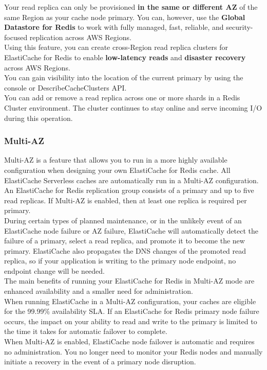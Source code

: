 \documentclass[12pt, letterpaper, twoside]{article}
\begin{document}

Your read replica can only be provisioned \textbf{in the same or different AZ} of the same Region as your cache node primary. 
You can, however, use the \textbf{Global Datastore for Redis} to work with fully managed, fast, reliable, and security-focused replication 
across AWS Regions.\\
Using this feature, you can create cross-Region read replica clusters for ElastiCache for Redis to enable \textbf{low-latency reads} 
and \textbf{disaster recovery} across AWS Regions.\\

You can gain visibility into the location of the current primary by using the console or DescribeCacheClusters API.\\

You can add or remove a read replica across one or more shards in a Redis Cluster environment. The cluster continues to stay online and 
serve incoming I/O during this operation.\\

\subsubsection{Multi-AZ}
Multi-AZ is a feature that allows you to run in a more highly available configuration when designing your own ElastiCache for Redis cache.
All ElastiCache Serverless caches are automatically run in a Multi-AZ configuration. An ElastiCache for Redis replication group consists 
of a primary and up to five read replicas. If Multi-AZ is enabled, then at least one replica is required per primary.\\
During certain types of planned maintenance, or in the unlikely event of an ElastiCache node failure or AZ failure, ElastiCache will 
automatically detect the failure of a primary, select a read replica, and promote it to become the new primary. ElastiCache also propagates 
the DNS changes of the promoted read replica, so if your application is writing to the primary node endpoint, no endpoint change will be 
needed.\\

The main benefits of running your ElastiCache for Redis in Multi-AZ mode are enhanced availability and a smaller need for administration.\\
When running ElastiCache in a Multi-AZ configuration, your caches are eligible for the 99.99\% availability SLA. 
If an ElastiCache for Redis primary node failure occurs, the impact on your ability to read and write to the primary is limited to the time 
it takes for automatic failover to complete.\\
When Multi-AZ is enabled, ElastiCache node failover is automatic and requires no administration. You no longer need to monitor your Redis 
nodes and manually initiate a recovery in the event of a primary node disruption.\\
\end{document}
